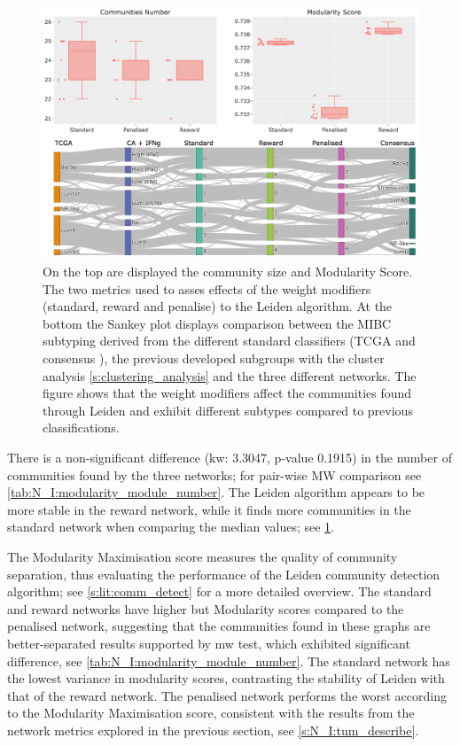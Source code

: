 \begin{figure}[!t]    
    \centering
    \includegraphics[width=1.0\textwidth,keepaspectratio]{Sections/Network_I/Resources/Tum_network/LeidenMetrics_Sankey_TF-6.png}
    \caption[Tum: Leiden metrics]{On the top are displayed the community size and Modularity Score. The two metrics used to asses effects of the weight modifiers (standard, reward and penalise) to the Leiden algorithm. At the bottom the Sankey plot displays comparison between the MIBC subtyping derived from the different standard classifiers (TCGA \citep{Robertson2017-mg} and consensus \citep{Kamoun2020-tj}), the previous developed subgroups with the cluster analysis \cref{s:clustering_analysis} and the three different networks. The figure shows that the weight modifiers affect the communities found through Leiden and exhibit different subtypes compared to previous classifications.}
    \label{fig:N_I:tum_leiden_modifiers}
\end{figure}


There is a non-significant difference (\acrshort{kw}:  3.3047, p-value 0.1915) in the number of communities found by the three networks; for pair-wise MW comparison see \cref{tab:N_I:modularity_module_number}. The Leiden algorithm appears to be more stable in the reward network, while it finds more communities in the standard network when comparing the median values; see \cref{fig:N_I:tum_leiden_modifiers}.

The Modularity Maximisation score measures the quality of community separation, thus evaluating the performance of the Leiden community detection algorithm; see \cref{s:lit:comm_detect} for a more detailed overview. The standard and reward networks have higher but Modularity scores compared to the penalised network, suggesting that the communities found in these graphs are better-separated results supported by \acrlong{mw} test, which exhibited significant difference, see \cref{tab:N_I:modularity_module_number}. The standard network has the lowest variance in modularity scores, contrasting the stability of Leiden with that of the reward network. The penalised network performs the worst according to the Modularity Maximisation score, consistent with the results from the network metrics explored in the previous section, see \cref{s:N_I:tum_describe}.


